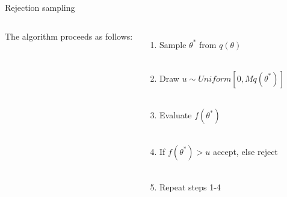 \documentclass[compress]{beamer}
\begin{document}
\begin{frame}[label=sec-5-8]{Rejection sampling}
\begin{columns}[c]
    The algorithm proceeds as follows:\\
    \begin{enumerate}
        \item Sample $\theta^*$ from $q(\theta)$ \\~\\
        \item Draw $u \sim Uniform[0, Mq(\theta^*)]$ \\~\\
        \item Evaluate $f(\theta^*)$ \\~\\
        \item If $f(\theta^*) > u$ accept, else reject \\~\\
        \item Repeat steps 1-4
    \end{enumerate}
\end{columns}
\end{frame}
\end{document}
